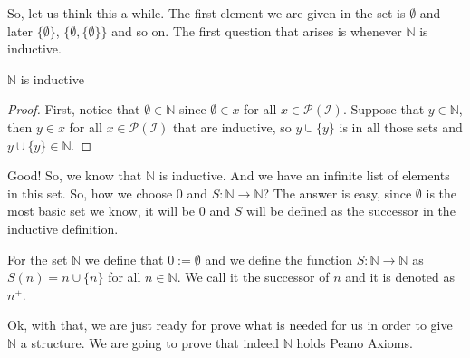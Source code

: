 \documentclass{tufte-handout}
\begin{document}
So, let us think this a while. The first element we are given in the set is $\emptyset$ and later $\{\emptyset\}$, $\{\emptyset, \{\emptyset\}\}$ and so on. The first question that arises is whenever $\mathbb{N}$ is inductive.
\begin{theorem}
	$\mathbb{N}$ is inductive
\end{theorem}
\begin{proof}
	First, notice that $\emptyset \in \mathbb{N}$ since $\emptyset \in x$ for all $x \in \mathcal{P}(\mathcal{I})$. Suppose that $y \in \mathbb{N}$, then $y \in x$ for all $x \in \mathcal{P}(\mathcal{I})$ that are inductive, so $y \cup \{y\}$ is in all those sets and $y \cup \{y\} \in \mathbb{N}$.
\end{proof}

Good! So, we know that $\mathbb{N}$ is inductive. And we have an infinite list of elements in this set. So, how we choose $0$ and $S: \mathbb{N} \to \mathbb{N}$? The answer is easy, since $\emptyset$ is the most basic set we know, it will be $0$ and $S$ will be defined as the successor in the inductive definition.
\begin{definition}
	For the set $\mathbb{N}$ we define that $0 := \emptyset$ and we define the function $S: \mathbb{N} \to \mathbb{N}$ as $S(n) = n \cup \{n\}$ for all $n \in \mathbb{N}$. We call it the successor of $n$ and it is denoted as $n^+$.
\end{definition}

Ok, with that, we are just ready for prove what is needed for us in order to give $\mathbb{N}$ a structure. We are going to prove that indeed $\mathbb{N}$ holds Peano Axioms.
\end{document}
